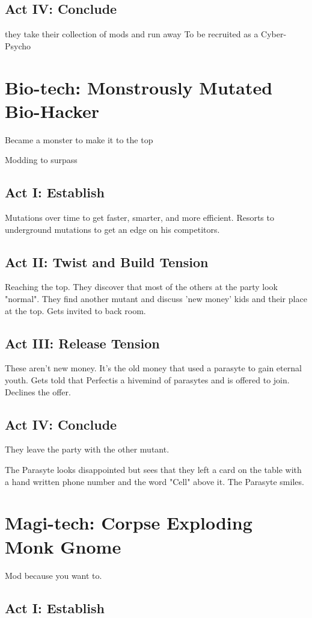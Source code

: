\documentclass[]{article}
\newcommand{\megacorpB}{Perfect\texttrademark}
\begin{document}
\subsection*{Act IV: Conclude}
they take their collection of mods and run away To be recruited as a Cyber-Psycho

\section{Bio-tech: Monstrously Mutated Bio-Hacker}
Became a monster to make it to the top

Modding to surpass
\subsection*{Act I: Establish}
Mutations over time to get faster, smarter, and more efficient. Resorts to underground mutations to get an edge on his competitors.
\subsection*{Act II: Twist and Build Tension}
Reaching the top. They discover that most of the others at the party look "normal". They find another mutant and discuss 'new money' kids and their place at the top. Gets invited to back room.
\subsection*{Act III: Release Tension}
These aren't new money. It's the old money that used a parasyte to gain eternal youth. Gets told that \megacorpB is a hivemind of parasytes and is offered to join. Declines the offer.
\subsection*{Act IV: Conclude}
They leave the party with the other mutant. 

The Parasyte looks disappointed but sees that they left a card on the table with a hand written phone number and the word "Cell" above it. The Parasyte smiles.

\section{Magi-tech: Corpse Exploding Monk Gnome}
Mod because you want to.
\subsection*{Act I: Establish}
\end{document}
